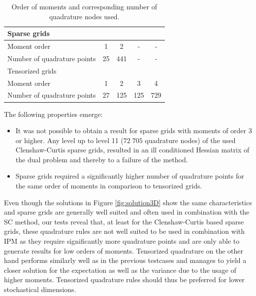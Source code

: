 \begin{table}
	\centering
	\begin{tabular}{l|cccc}
		Sparse grids&&&&\\\hline
		\quad Moment order&1&2&-&-\\
		\quad Number of quadrature points&25&441&-&-\\
		Tensorized grids & & & & \\\hline
		\quad Moment order&1&2&3&4\\
		\quad Number of quadrature points&27&125&125&729\\
	\end{tabular}
	\caption{Order of moments and corresponding number of quadrature nodes used.}
	\label{tab:orders3D}
\end{table}
The following properties emerge:
\begin{itemize}
	\item It was not possible to obtain a result for sparse grids with moments of order 3 or higher. Any level up to level 11 ($72\;705$ quadrature nodes) of the used Clenshaw-Curtis sparse grids, resulted in an ill conditioned Hessian matrix of the dual problem and thereby to a failure of the method.
	\item Sparse grids required a significantly higher number of quadrature points for the same order of moments in comparison to tensorized grids.
\end{itemize}
Even though the solutions in Figure \ref{fig:solution3D} show the same characteristics and sparse grids are generally well suited and often used in combination with the SC method, our tests reveal that, at least for the Clenshaw-Curtis based sparse grids, these quadrature rules are not well suited to be used in combination with IPM as they require significantly more quadrature points and are only able to generate results for low orders of moments. Tensorized quadrature on the other hand performs similarly well as in the previous testcases and manages to yield a closer solution for the expectation as well as the variance due to the usage of higher moments. Tensorized quadrature rules should thus be preferred for lower stochastical dimensions. 
